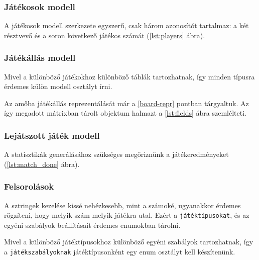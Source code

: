 

\subsubsection{Játékosok modell}
A játékosok modell szerkezete egyszerű, csak három azonosítót tartalmaz: a két résztvevő és a soron következő játékos számát (\ref{lst:players} ábra).



\subsubsection{Játékállás modell}
Mivel a különböző játékokhoz különböző táblák tartozhatnak, így minden típusra érdemes külön modell osztályt írni.

Az amőba játékállás reprezentálását már a \ref{board-repr} pontban tárgyaltuk. Az így megadott mátrixban tárolt objektum halmazt a \ref{lst:fields} ábra szemlélteti.



\subsubsection{Lejátszott játék modell}
A statisztikák generálásához szükséges megőriznünk a játékeredményeket (\ref{lst:match_done} ábra).



\subsubsection{Felsorolások}
A sztringek kezelése kissé nehézkesebb, mint a számoké, ugyanakkor érdemes rögzíteni, hogy melyik szám melyik játékra utal. Ezért a \texttt{játéktípusokat}, és az egyéni szabályok beállításait érdemes enumokban tárolni.

Mivel a különböző játéktípusokhoz különböző egyéni szabályok tartozhatnak, így a \texttt{játékszabályoknak} játéktípusonként egy enum osztályt kell készítenünk.

